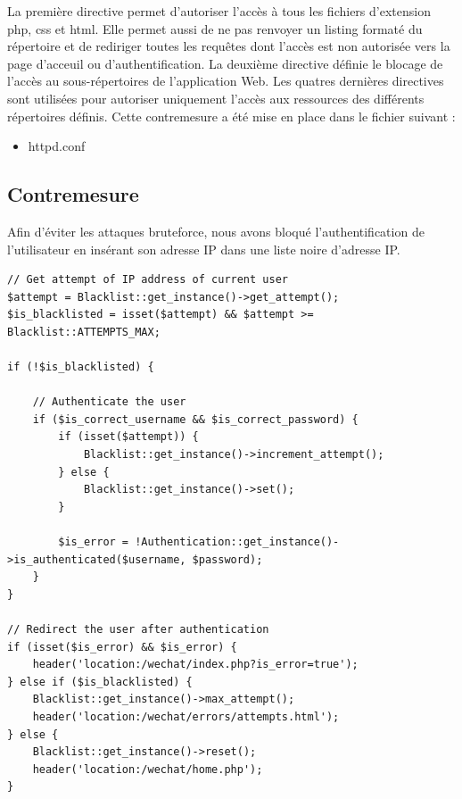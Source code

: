 \documentclass[12pt]{article}
\begin{document}
La première directive permet d'autoriser l'accès à tous les fichiers d'extension php, css et html. Elle permet aussi de ne pas renvoyer un listing formaté du répertoire et de rediriger toutes les requêtes dont l'accès est non autorisée vers la page d'acceuil ou d'authentification. 
La deuxième directive définie le blocage de l'accès au sous-répertoires de l'application Web.
Les quatres dernières directives sont utilisées pour autoriser uniquement l'accès aux ressources des différents répertoires définis.
Cette contremesure a été mise en place dans le fichier suivant :

\begin{itemize}
\item httpd.conf
\end{itemize}

\subsection{Contremesure}\label{c6}

Afin d'éviter les attaques bruteforce, nous avons bloqué l'authentification de l'utilisateur en insérant son adresse IP dans une liste noire d'adresse IP.

\begin{lstlisting}[style=JAVA]
// Get attempt of IP address of current user
$attempt = Blacklist::get_instance()->get_attempt();
$is_blacklisted = isset($attempt) && $attempt >= Blacklist::ATTEMPTS_MAX;

if (!$is_blacklisted) {
    
    // Authenticate the user
    if ($is_correct_username && $is_correct_password) {
        if (isset($attempt)) {
            Blacklist::get_instance()->increment_attempt();
        } else {
            Blacklist::get_instance()->set();
        }

        $is_error = !Authentication::get_instance()->is_authenticated($username, $password);
    }
}

// Redirect the user after authentication
if (isset($is_error) && $is_error) {
    header('location:/wechat/index.php?is_error=true');
} else if ($is_blacklisted) {
    Blacklist::get_instance()->max_attempt();
    header('location:/wechat/errors/attempts.html');
} else {
    Blacklist::get_instance()->reset();
    header('location:/wechat/home.php');
}
\end{lstlisting}
\end{document}
